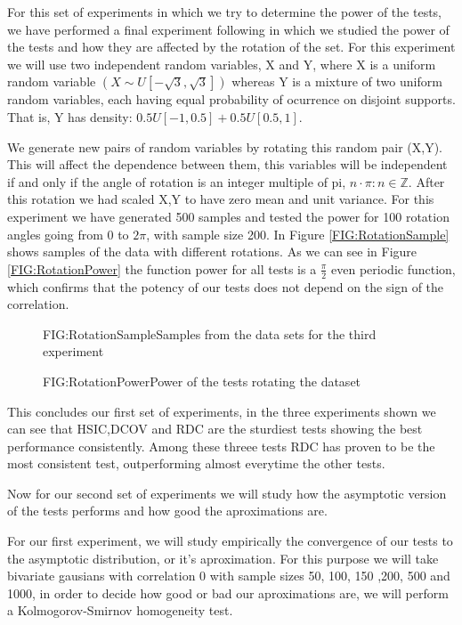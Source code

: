 For this set of experiments in which we try to determine the power of the tests, we have performed a final experiment following \cite{Size} in which we studied the power of the tests and how they are affected by the rotation of the set.
For this experiment we will use two independent random variables, X and Y, where X is a uniform random variable $(X\sim U[-\sqrt{3},\sqrt{3}])$ whereas Y is a mixture of two uniform random variables, each having equal probability of ocurrence on disjoint supports. That is, Y has density: $0.5U[-1,0.5] + 0.5U[0.5,1]$.

We generate new pairs of random variables by rotating this random pair (X,Y). This will affect the dependence between them, this variables will be independent if and only if the angle of rotation is an integer multiple of pi, $n\cdot\pi : n\in\mathbb{Z}$. After this rotation we had scaled X,Y to have zero mean and unit variance.
For this experiment we have generated 500 samples and tested the power for 100 rotation angles going from 0 to $2\pi$, with sample size 200. In Figure \ref{FIG:RotationSample} shows samples of the data with different rotations.
As we can see in Figure \ref{FIG:RotationPower} the function power for all tests is a $\frac{\pi}{2}$ even periodic function, which confirms that the potency of our tests does not depend on the sign of the correlation.

\begin{figure}[Experiment 3 rotation pattern sample]{FIG:RotationSample}{Samples from the data sets for the third experiment}
\end{figure}
\begin{figure}[Experiment 3 results]{FIG:RotationPower}{Power of the tests rotating the dataset}
\end{figure}

This concludes our first set of experiments, in the three experiments shown we can see that HSIC,DCOV and RDC are the sturdiest tests showing the best performance consistently. Among these threee tests RDC has proven to be the most consistent test, outperforming almost everytime the other tests. 

Now for our second set of experiments we will study how the asymptotic version of the tests performs and how good the aproximations are.

For our first experiment, we will study empirically the convergence of our tests to the asymptotic distribution, or it's aproximation. For this purpose we will take  bivariate gausians with correlation 0 with sample sizes  50, 100, 150 ,200, 500 and 1000, in order to decide how good or bad our aproximations are, we will perform a Kolmogorov-Smirnov homogeneity test.

